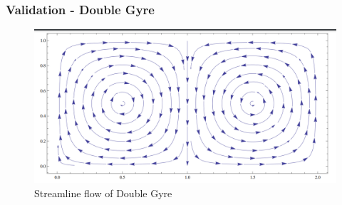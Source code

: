 \documentclass[../presentation.tex]{subfiles}
\begin{document}
\begin{frame}
  \frametitle{Validation - Double Gyre}
  \begin{figure}
    \centering
    \includegraphics[width=\linewidth]{images/image_2.png}
    \caption{Streamline flow of Double Gyre}
    \label{figg:fig_2}
  \end{figure}
\end{frame}
\end{document}
